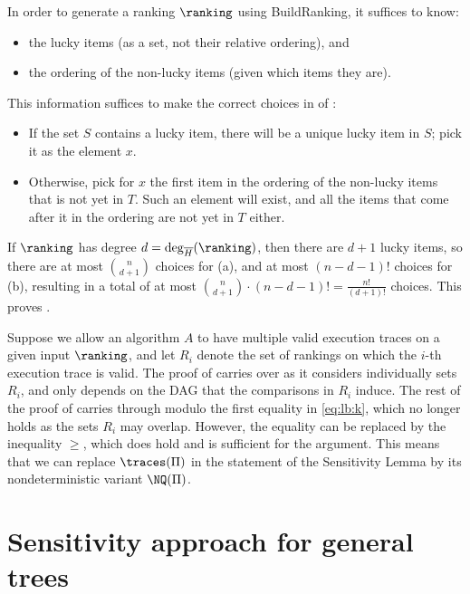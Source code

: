 \documentclass{toc}
\begin{document}
In order to generate a ranking $\ranking$ using BuildRanking, it suffices to know:
\begin{itemize}
\item[(a)] the lucky items (as a set, not their relative ordering), and 
\item[(b)] the ordering of the non-lucky items (given which items they are).
\end{itemize}
This information suffices to make the correct choices in  of :
\begin{itemize}
\item 
If the set $S$ contains a lucky item, there will be a unique lucky item in  $S$; pick it as the element $x$.
\item 
Otherwise, pick for $x$ the first item in the ordering of the non-lucky items that is not yet in $T$. Such an element will exist, and all the items that come after it in the ordering are not yet in $T$ either.
\end{itemize}
If $\ranking$ has degree $d = \deg_{\overline{H}}(\ranking)$, then there are $d+1$ lucky items, so there are at most $\binom{n}{d+1}$ choices for (a), and at most $(n-d-1)!$ choices for (b), resulting in a total of at most $\binom{n}{d+1} \cdot (n-d-1)! = \frac{n!}{(d+1)!}$ choices. This proves .

\begin{remark}\label{remark:sensitivity}
Suppose we allow an algorithm $A$ to have multiple valid execution traces on a given input $\ranking$, and let $R_i$ denote the set of rankings on which the $i$-th execution trace is valid. The proof of  carries over as it considers individually sets $R_i$, and only depends on the DAG that the comparisons in $R_i$ induce. The rest of the proof of  carries through modulo the first equality in \eqref{eq:lb:k}, which no longer holds as the sets $R_i$ may overlap. However, the equality can be replaced by the inequality $\ge$, which does hold and is sufficient for the argument. This means that we can replace $\traces(\Pi)$ in the statement of the Sensitivity Lemma by its nondeterministic variant $\NQ(\Pi)$.
\end{remark}



\section{Sensitivity approach for general trees}
\label{sec:sensitivity:general}
\end{document}

